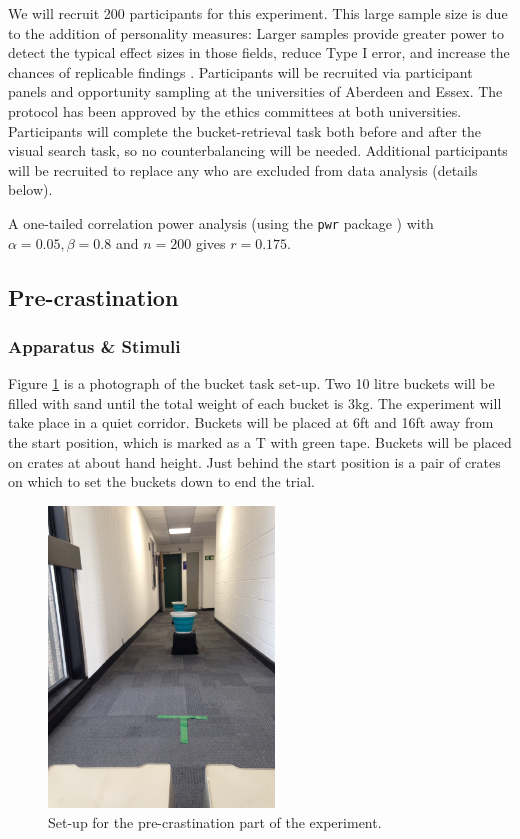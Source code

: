\documentclass[]{rsos}
\begin{document}
We will recruit 200 participants for this experiment. This large sample size is due to the addition of personality measures: Larger samples provide greater power to detect the typical effect sizes in those fields, reduce Type I error, and increase the chances of replicable findings \cite{fraley2014}. Participants will be recruited via participant panels and opportunity sampling at the universities of Aberdeen and Essex. The protocol has been approved by the ethics committees at both universities. Participants will complete the bucket-retrieval task both before and after the visual search task, so no counterbalancing will be needed. Additional participants will be recruited to replace any who are excluded from data analysis (details below). 

A one-tailed correlation power analysis (using the \texttt{pwr} package \cite{pwr}) with $\alpha=0.05, \beta=0.8$ and $n=200$ gives $r=0.175$.

\subsection{Pre-crastination}
\label{sec:pre-crastination_methods}
\subsubsection{Apparatus \& Stimuli}

Figure \ref{fig:buckets} is a photograph of the bucket task set-up. Two 10 litre buckets will be filled with sand until the total weight of each bucket is 3kg. The experiment will take place in a quiet corridor. Buckets will be placed at 6ft and 16ft away from the start position, which is marked as a T with green tape. Buckets will be placed on crates at about hand height. Just behind the start position is a pair of crates on which to set the buckets down to end the trial.

\begin{figure}
\centering
\includegraphics[width=6cm]{Figures/IMG_7939.jpg}
\caption{Set-up for the pre-crastination part of the experiment.}
\label{fig:buckets}
\end{figure}
\end{document}
